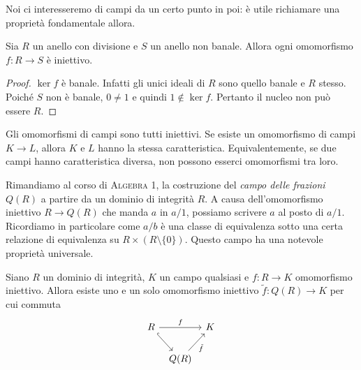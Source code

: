 Noi ci interesseremo di campi da un certo punto in poi: è utile richiamare una proprietà fondamentale allora.

\begin{prop}\label{prop:OmomorfismiCampiSonoIniettivi}
Sia $R$ un anello con divisione e $S$ un anello non banale. Allora ogni omomorfismo $f : R \to S$ è iniettivo.
\end{prop}

\begin{proof}
$\ker f$ è banale. Infatti gli unici ideali di $R$ sono quello banale e $R$ stesso. Poiché $S$ non è banale, $0 \ne 1$ e quindi $1 \notin \ker f$. Pertanto il nucleo non può essere $R$.
\end{proof}

\begin{coro}
Gli omomorfismi di campi sono tutti iniettivi. Se esiste un omomorfismo di campi $K \to L$, allora $K$ e $L$ hanno la stessa caratteristica. Equivalentemente, se due campi hanno caratteristica diversa, non possono esserci omomorfismi tra loro.
\end{coro}



Rimandiamo al corso di {\scshape Algebra 1}, la costruzione del {\em campo delle frazioni} $Q(R)$ a partire da un dominio di integrità $R$. A causa dell'omomorfismo iniettivo $R \to Q(R)$ che manda $a$ in $a/1$, possiamo scrivere $a$ al posto di $a/1$. Ricordiamo in particolare come $a/b$ è una classe di equivalenza sotto una certa relazione di equivalenza su $R \times (R \setminus \{0\})$. Questo campo ha una notevole proprietà universale.


\begin{lemm}\label{lemm:CampoFrazioni}
Siano $R$ un dominio di integrità, $K$ un campo qualsiasi e $f : R \to K$ omomorfismo iniettivo. Allora esiste uno e un solo omomorfismo iniettivo $\tilde f : Q(R) \to K$ per cui commuta
\[\begin{tikzcd}[column sep=tiny]
R \ar[hookrightarrow, dr, swap] \ar["f", rr] & & K \\
 & Q(R) \ar["{\tilde f}", ur, swap]
\end{tikzcd}\]
\end{lemm}

